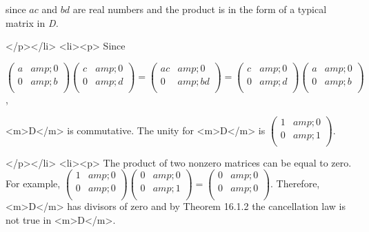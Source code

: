 since \(a c\) and \(b d\) are real numbers and the product is in the form of a typical matrix in \textit{ D.}

</p></li>
<li><p>  Since



\(\left(
\begin{array}{cc}
 a &amp; 0 \\
 0 &amp; b \\
\end{array}
\right) \left(
\begin{array}{cc}
 c &amp; 0 \\
 0 &amp; d \\
\end{array}
\right)= \left(
\begin{array}{cc}
 a c &amp; 0 \\
 0 &amp; b d \\
\end{array}
\right)=\left(
\begin{array}{cc}
 c &amp; 0 \\
 0 &amp; d \\
\end{array}
\right)\left(
\begin{array}{cc}
 a &amp; 0 \\
 0 &amp; b \\
\end{array}
\right)\),



       <m>D</m> is commutative.    The unity for <m>D</m> is \(\left(
\begin{array}{cc}
 1 &amp; 0 \\
 0 &amp; 1 \\
\end{array}
\right)\).

</p></li>
<li><p> The product of two nonzero matrices can be equal to zero.  For example,  \(\left(
\begin{array}{cc}
 1 &amp; 0 \\
 0 &amp; 0 \\
\end{array}
\right) \left(
\begin{array}{cc}
 0 &amp; 0 \\
 0 &amp; 1 \\
\end{array}
\right)= \left(
\begin{array}{cc}
 0 &amp; 0 \\
 0 &amp; 0 \\
\end{array}
\right)\).  Therefore, <m>D</m> has divisors of zero and by Theorem 16.1.2 the cancellation law is not true in <m>D</m>.

